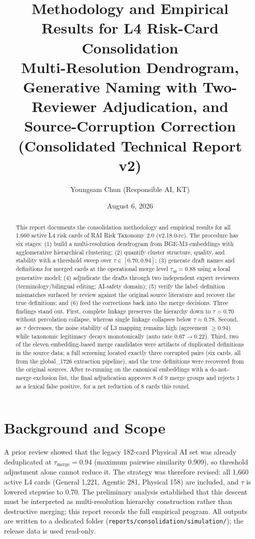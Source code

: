 \documentclass[11pt,a4paper]{article}
\title{\textbf{Methodology and Empirical Results for L4 Risk-Card Consolidation}\\[4pt]
\large Multi-Resolution Dendrogram, Generative Naming with Two-Reviewer Adjudication, and Source-Corruption Correction (Consolidated Technical Report v2)}
\author{Youngsam Chun (Responsible AI, KT)}
\date{August 6, 2026}
\begin{document}
\maketitle

\begin{abstract}
This report documents the consolidation methodology and empirical results for all 1,660 active L4 risk cards of RAI Risk Taxonomy 2.0 (v2.18.0-rc). The procedure has six stages: (1) build a multi-resolution dendrogram from BGE-M3 embeddings with agglomerative hierarchical clustering; (2) quantify cluster structure, quality, and stability with a threshold sweep over $\tau \in [0.70, 0.94]$; (3) generate draft names and definitions for merged cards at the operational merge level $\tau_{op}=0.88$ using a local generative model; (4) adjudicate the drafts through two independent expert reviewers (terminology/bilingual editing; AI-safety domain); (5) verify the label--definition mismatches surfaced by review against the original source literature and recover the true definitions; and (6) feed the corrections back into the merge decisions. Three findings stand out. First, complete linkage preserves the hierarchy down to $\tau=0.70$ without percolation collapse, whereas single linkage collapses below $\tau \approx 0.78$. Second, as $\tau$ decreases, the noise stability of L3 mapping remains high (agreement $\geq 0.94$) while taxonomic legitimacy decays monotonically (auto rate $0.67 \to 0.22$). Third, two of the eleven embedding-based merge candidates were artifacts of duplicated definitions in the source data; a full screening located exactly three corrupted pairs (six cards, all from the global\_1726 extraction pipeline), and the true definitions were recovered from the original sources. After re-running on the canonical embeddings with a do-not-merge exclusion list, the final adjudication approves 8 of 9 merge groups and rejects 1 as a lexical false positive, for a net reduction of 8 cards this round.
\end{abstract}

\section{Background and Scope}

A prior review showed that the legacy 182-card Physical AI set was already deduplicated at $\tau_{\mathrm{merge}}=0.94$ (maximum pairwise similarity 0.909), so threshold adjustment alone cannot reduce it. The strategy was therefore revised: all 1,660 active L4 cards (General 1,221, Agentic 281, Physical 158) are included, and $\tau$ is lowered stepwise to 0.70. The preliminary analysis established that this descent must be interpreted as multi-resolution hierarchy construction rather than destructive merging; this report records the full empirical program. All outputs are written to a dedicated folder (\texttt{reports/consolidation/simulation/}); the release data is used read-only.
\end{document}
